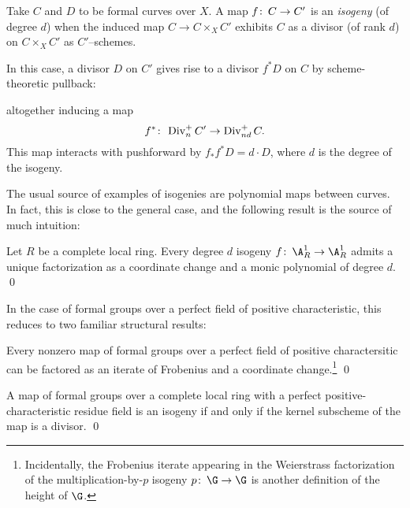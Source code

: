 \begin{definition}
Take $C$ and $D$ to be formal curves over $X$.  A map $f\colon\thinspace C \to C'$ is an \textit{isogeny} (of degree $d$) when the induced map $C \to C \times_X C'$ exhibits $C$ as a divisor (of rank $d$) on $C \times_X C'$ as $C'$--schemes.
\end{definition}

\begin{remark}
In this case, a divisor $D$ on $C'$ gives rise to a divisor $f^* D$ on $C$ by scheme-theoretic pullback:
\begin{center}
\end{center}
altogether inducing a map \[f^*\colon\thinspace \operatorname{Div}_n^+ C' \to \operatorname{Div}_{nd}^+ C.\]  This map interacts with pushforward by $f_* f^* D = d \cdot D$, where $d$ is the degree of the isogeny.
\end{remark}

The usual source of examples of isogenies are polynomial maps between curves.  In fact, this is close to the general case, and the following result is the source of much intuition:
\begin{lemma}
Let $R$ be a complete local ring.  Every degree $d$ isogeny $f\co \A^1_R \to \A^1_R$ admits a unique factorization as a coordinate change and a monic polynomial of degree $d$. \qed
\end{lemma}

\noindent In the case of formal groups over a perfect field of positive characteristic, this reduces to two familiar structural results:

\begin{corollary}
Every nonzero map of formal groups over a perfect field of positive charactersitic can be factored as an iterate of Frobenius and a coordinate change.\footnote{Incidentally, the Frobenius iterate appearing in the Weierstrass factorization of the multiplication-by-$p$ isogeny $p\co \G \to \G$ is another definition of the height of $\G$.} \qed
\end{corollary}

\begin{corollary}
A map of formal groups over a complete local ring with a perfect positive-characteristic residue field is an isogeny if and only if the kernel subscheme of the map is a divisor. \qed
\end{corollary}

